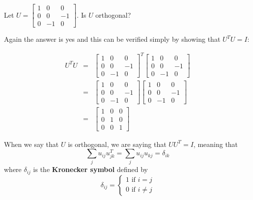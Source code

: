 \documentclass{ximera}
\begin{document}
\begin{example}\label{ex:OrthogonalMatrix2}
Let $U=\begin{bmatrix}
1 & 0 & 0 \\
0 & 0 & -1 \\
0 & -1 & 0
\end{bmatrix}.$ Is $U$ orthogonal?
\end{example}

\begin{explanation}
Again the answer is yes and this can be verified simply by showing that $U^{T}U=I$:

\begin{eqnarray*}
U^{T}U&=&\begin{bmatrix}
1 & 0 & 0 \\
0 & 0 & -1 \\
0 & -1 & 0
\end{bmatrix}^{T}\begin{bmatrix}
1 & 0 & 0 \\
0 & 0 & -1 \\
0 & -1 & 0
\end{bmatrix} \\
&=&\begin{bmatrix}
1 & 0 & 0 \\
0 & 0 & -1 \\
0 & -1 & 0
\end{bmatrix}
\begin{bmatrix}
1 & 0 & 0 \\
0 & 0 & -1 \\
0 & -1 & 0
\end{bmatrix} \\
&=&\begin{bmatrix}
1 & 0 & 0 \\
0 & 1 & 0 \\
0 & 0 & 1
\end{bmatrix}
\end{eqnarray*}
\end{explanation}

When we say that $U$ is orthogonal, we are saying that $UU^T=I$, meaning that
\begin{equation*}
\sum_{j}u_{ij}u_{jk}^{T}=\sum_{j}u_{ij}u_{kj}=\delta _{ik}
\end{equation*}
where $\delta _{ij}$ is the \textbf{Kronecker symbol}
defined
 by
\begin{equation*}
\delta _{ij}=\left\{
\begin{array}{c}
1
\text{ if }i=j \\
0\text{ if }i\neq j
\end{array}
\right.
\end{equation*}
\end{document}
